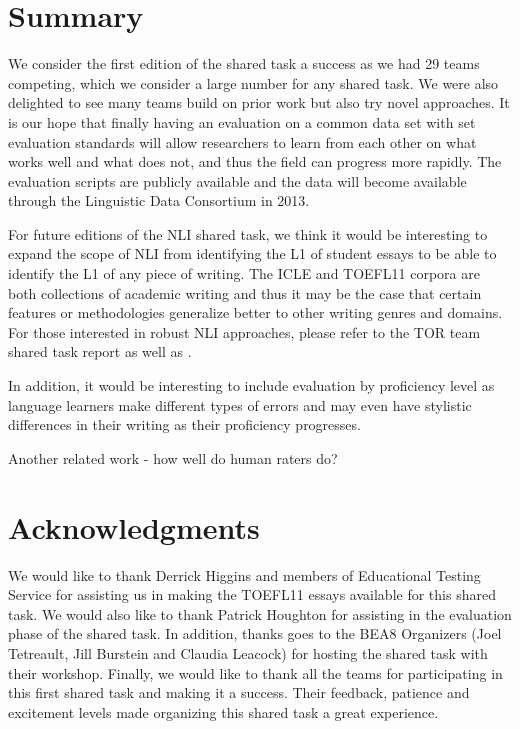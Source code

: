 \documentclass[11pt,letterpaper]{article}
\begin{document}
\section{Summary} 
We consider the first edition of the shared task a success as we had
29 teams competing, which we consider a large number for any
shared task.  We were also delighted to see many teams build on
prior work but also try novel approaches.  It is our hope that 
finally having an evaluation on a common data set with set
evaluation standards will allow researchers to learn from each
other on what works well and what does not, and thus the
field can progress more rapidly.  The evaluation scripts are 
publicly available and the data will become 
available through the Linguistic Data Consortium in 2013.  

For future editions of the NLI shared task, we think it would be
interesting to expand the scope of NLI from identifying the L1
of student essays to be able to identify the L1 of any piece of 
writing.  The ICLE and \textsc{TOEFL11} corpora are both
collections of academic writing and thus it may be the case that
certain features or methodologies generalize better to other
writing genres and domains.  For those interested in robust
NLI approaches, please refer to the TOR team shared task report
as well as \cite{brooke-hirst:2012:PAPERS}.

In addition, it would be interesting to include evaluation by 
proficiency level
as language learners make different types of errors
and may even have stylistic differences in their writing as their
proficiency progresses.  

Another related work - how well do human raters do?


\section*{Acknowledgments}
We would like to thank Derrick Higgins and members of Educational
Testing Service for assisting us in making the \textsc{TOEFL11} essays
available for this shared task.  We would also like to thank
Patrick Houghton for assisting in the evaluation phase of the shared task.
In addition, thanks goes to the BEA8 Organizers (Joel Tetreault,
Jill Burstein and Claudia Leacock) for hosting the shared
task with their workshop.  Finally, we would like to thank all the teams for 
participating in this first shared task and making it a success.
Their feedback, patience and excitement levels made organizing this
shared task a great experience.







\end{document}
